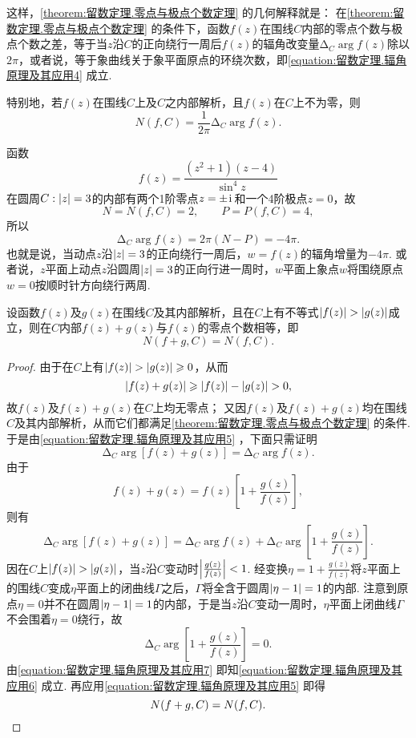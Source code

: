 这样，\cref{theorem:留数定理.零点与极点个数定理} 的几何解释就是：
在\cref{theorem:留数定理.零点与极点个数定理} 的条件下，函数\(f(z)\)在围线\(C\)内部的零点个数与极点个数之差，等于当\(z\)沿\(C\)的正向绕行一周后\(f(z)\)的辐角改变量\(\increment_C \arg f(z)\)除以\(2\pi\)，或者说，等于象曲线关于象平面原点的环绕次数，即\cref{equation:留数定理.辐角原理及其应用4} 成立.

特别地，若\(f(z)\)在围线\(C\)上及\(C\)之内部解析，且\(f(z)\)在\(C\)上不为零，则\begin{equation}\label{equation:留数定理.辐角原理及其应用5}
N(f,C) = \frac{1}{2\pi} \increment_C \arg f(z).
\end{equation}

\begin{example}
函数\[
f(z) = \frac{(z^2+1)(z-4)}{\sin^4 z}
\]在圆周\(C: \abs{z}=3\)的内部有两个1阶零点\(z=\pm\kern1pt\mathrm{i}\kern1pt\)和一个4阶极点\(z=0\)，故\[
N=N(f,C)=2, \qquad P=P(f,C)=4,
\]所以\[
\increment_C \arg f(z) = 2\pi(N - P) = -4\pi.
\]也就是说，当动点\(z\)沿\(\abs{z}=3\)的正向绕行一周后，\(w = f(z)\)的辐角增量为\(-4\pi\).
或者说，\(z\)平面上动点\(z\)沿圆周\(\abs{z}=3\)的正向行进一周时，\(w\)平面上象点\(w\)将围绕原点\(w=0\)按顺时针方向绕行两周.
\end{example}

\begin{theorem}[儒歇定理]
设函数\(f(z)\)及\(g(z)\)在围线\(C\)及其内部解析，且在\(C\)上有不等式\(\abs{f(z)}>\abs{g(z)}\)成立，则在\(C\)内部\(f(z)+g(z)\)与\(f(z)\)的零点个数相等，即\[
N(f+g,C) = N(f,C).
\]
\begin{proof}
由于在\(C\)上有\(\abs{f(z)}>\abs{g(z)}\geqslant0\)，从而\[
\abs{f(z)+g(z)}\geqslant\abs{f(z)}-\abs{g(z)}>0,
\]故\(f(z)\)及\(f(z)+g(z)\)在\(C\)上均无零点；
又因\(f(z)\)及\(f(z)+g(z)\)均在围线\(C\)及其内部解析，从而它们都满足\cref{theorem:留数定理.零点与极点个数定理} 的条件.
于是由\cref{equation:留数定理.辐角原理及其应用5} ，下面只需证明\begin{equation}\label{equation:留数定理.辐角原理及其应用6}
\increment_C \arg[f(z)+g(z)] = \increment_C \arg f(z).
\end{equation}
由于\[
f(z)+g(z) = f(z) \left[1+\frac{g(z)}{f(z)}\right],
\]则有\begin{equation}\label{equation:留数定理.辐角原理及其应用7}
\increment_C \arg[f(z)+g(z)] = \increment_C \arg f(z) + \increment_C \arg\left[1+\frac{g(z)}{f(z)}\right].
\end{equation}
因在\(C\)上\(\abs{f(z)}>\abs{g(z)}\)，当\(z\)沿\(C\)变动时\(\abs{\frac{g(z)}{f(z)}}<1\).
经变换\(\eta=1+\frac{g(z)}{f(z)}\)将\(z\)平面上的围线\(C\)变成\(\eta\)平面上的闭曲线\(\Gamma\)之后，\(\Gamma\)将全含于圆周\(\abs{\eta-1}=1\)的内部.
注意到原点\(\eta=0\)并不在圆周\(\abs{\eta-1}=1\)的内部，于是当\(z\)沿\(C\)变动一周时，\(\eta\)平面上闭曲线\(\Gamma\)不会围着\(\eta=0\)绕行，故\[
\increment_C \arg\left[1+\frac{g(z)}{f(z)}\right] = 0.
\]
由\cref{equation:留数定理.辐角原理及其应用7} 即知\cref{equation:留数定理.辐角原理及其应用6} 成立.
再应用\cref{equation:留数定理.辐角原理及其应用5} 即得\[
N(f+g,C) = N(f,C).
\qedhere
\]
\end{proof}
\end{theorem}

